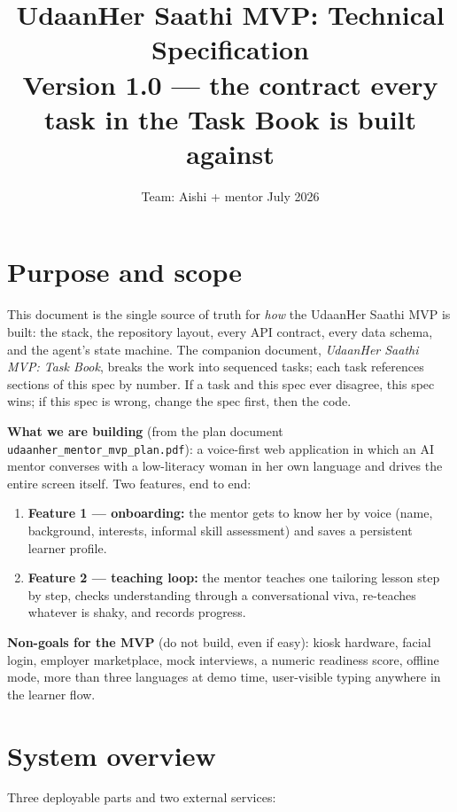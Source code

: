 \documentclass[11pt]{article}
\title{\textbf{UdaanHer Saathi MVP: Technical Specification}\\
\large Version 1.0 --- the contract every task in the Task Book is built against}
\author{Team: Aishi + mentor \quad\textbullet\quad 9 July 2026}
\date{}
\newcommand{\code}[1]{\texttt{#1}}
\begin{document}
\maketitle

\tableofcontents

\section{Purpose and scope}

This document is the single source of truth for \emph{how} the UdaanHer Saathi MVP is built: the stack, the repository layout, every API contract, every data schema, and the agent's state machine. The companion document, \emph{UdaanHer Saathi MVP: Task Book}, breaks the work into sequenced tasks; each task references sections of this spec by number. If a task and this spec ever disagree, this spec wins; if this spec is wrong, change the spec first, then the code.

\textbf{What we are building} (from the plan document \code{udaanher\_mentor\_mvp\_plan.pdf}): a voice-first web application in which an AI mentor converses with a low-literacy woman in her own language and drives the entire screen itself. Two features, end to end:

\begin{enumerate}
  \item \textbf{Feature 1 --- onboarding:} the mentor gets to know her by voice (name, background, interests, informal skill assessment) and saves a persistent learner profile.
  \item \textbf{Feature 2 --- teaching loop:} the mentor teaches one tailoring lesson step by step, checks understanding through a conversational viva, re-teaches whatever is shaky, and records progress.
\end{enumerate}

\textbf{Non-goals for the MVP} (do not build, even if easy): kiosk hardware, facial login, employer marketplace, mock interviews, a numeric readiness score, offline mode, more than three languages at demo time, user-visible typing anywhere in the learner flow.

\section{System overview}

Three deployable parts and two external services:
\end{document}
